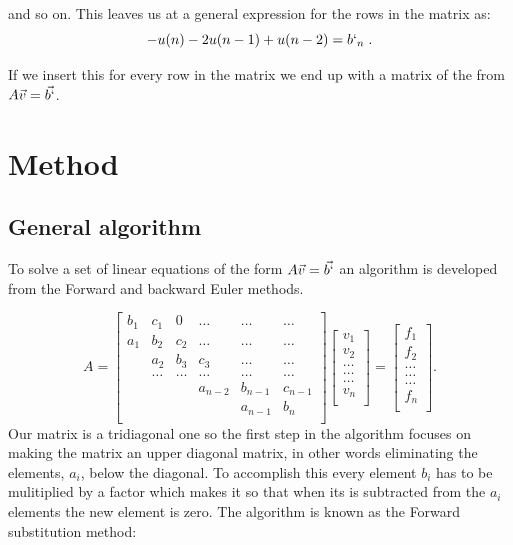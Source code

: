 \documentclass[english,a4paper, 11pt]{article}
\begin{document}
 and so on. This leaves us at a general expression for the rows in the matrix as:
 \begin{equation}
 -u(n)  - 2u(n-1) + u(n-2)= b`_n\;.
 \label{eq13}
 \end{equation}
 
 If we insert this for every row in the matrix we end up with a matrix of the from $A\vec{v} = \vec{b`}$.
 
\section{Method}
\subsection{General algorithm}
To solve a set of linear equations of the form $A\vec{v} = \vec{b`}$ an algorithm is developed from the Forward and backward Euler methods. 

$$
    A = \begin{bmatrix}
                           b_1& c_1 & 0 &\dots   & \dots &\dots \\
                           a_1 & b_2 & c_2 &\dots &\dots &\dots \\
                           & a_2 & b_3 & c_3 & \dots & \dots \\
                           & \dots   & \dots &\dots   &\dots & \dots \\
                           &   &  &a_{n-2}  &b_{n-1}& c_{n-1} \\
                           &    &  &   &a_{n-1} & b_n \\
                      \end{bmatrix}\begin{bmatrix}
                           v_1\\
                           v_2\\
                           \dots \\
                          \dots  \\
                          \dots \\
                           v_n\\
                      \end{bmatrix}
  =\begin{bmatrix}
                           f_1\\
                           f_2\\
                           \dots \\
                           \dots \\
                          \dots \\
                           f_n\\
                      \end{bmatrix}.
$$
Our matrix is a tridiagonal one so the first step in the algorithm focuses on making the matrix an upper diagonal matrix, in other words eliminating the elements, $a_i$, below the diagonal. To accomplish this every element $b_i$ has to be mulitiplied by a factor which makes it so that when its is subtracted from the $a_i$ elements the new element is zero. The algorithm is known as the Forward substitution method:
\end{document}
